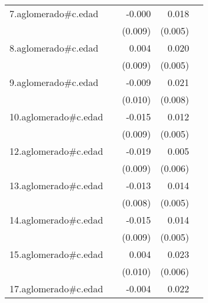 {\begin{longtable}{l*{4}{D{.}{.}{-1}}}
\addlinespace
7.aglomerado#c.edad&                     &      -0.000         &       0.018\sym{***}&                     \\
            &                     &     (0.009)         &     (0.005)         &                     \\
\addlinespace
8.aglomerado#c.edad&                     &       0.004         &       0.020\sym{***}&                     \\
            &                     &     (0.009)         &     (0.005)         &                     \\
\addlinespace
9.aglomerado#c.edad&                     &      -0.009         &       0.021\sym{**} &                     \\
            &                     &     (0.010)         &     (0.008)         &                     \\
\addlinespace
10.aglomerado#c.edad&                     &      -0.015         &       0.012\sym{*}  &                     \\
            &                     &     (0.009)         &     (0.005)         &                     \\
\addlinespace
12.aglomerado#c.edad&                     &      -0.019\sym{*}  &       0.005         &                     \\
            &                     &     (0.009)         &     (0.006)         &                     \\
\addlinespace
13.aglomerado#c.edad&                     &      -0.013         &       0.014\sym{**} &                     \\
            &                     &     (0.008)         &     (0.005)         &                     \\
\addlinespace
14.aglomerado#c.edad&                     &      -0.015         &       0.014\sym{**} &                     \\
            &                     &     (0.009)         &     (0.005)         &                     \\
\addlinespace
15.aglomerado#c.edad&                     &       0.004         &       0.023\sym{***}&                     \\
            &                     &     (0.010)         &     (0.006)         &                     \\
\addlinespace
17.aglomerado#c.edad&                     &      -0.004         &       0.022\sym{**} &                     \\

\end{longtable}}
